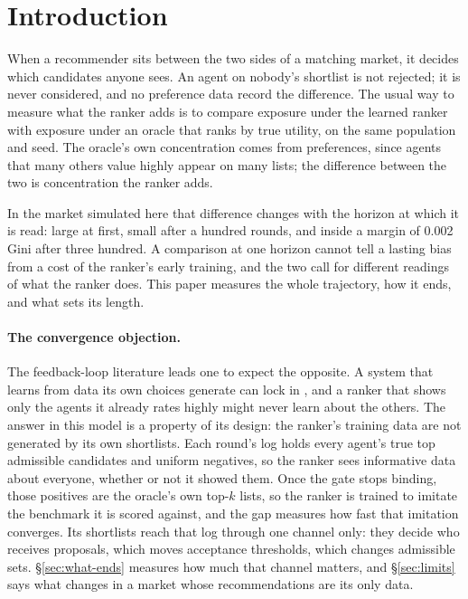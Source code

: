 
\section{Introduction}
\label{sec:intro}

When a recommender sits between the two sides of a matching market, it decides
which candidates anyone sees. An agent on nobody's shortlist is not rejected; it
is never considered, and no preference data record the difference. The usual way
to measure what the ranker adds is to compare exposure under the learned ranker
with exposure under an oracle that ranks by true utility, on the same population
and seed. The oracle's own concentration comes from preferences, since agents
that many others value highly appear on many lists; the difference between the
two is concentration the ranker adds.

In the market simulated here that difference changes with the horizon at which it
is read: large at first, small after a hundred rounds, and inside a margin of 0.002 Gini after three
hundred. A comparison at one horizon cannot tell a lasting bias
from a cost of the ranker's early training, and the two call for different
readings of what the ranker does. This paper measures the whole trajectory, how
it ends, and what sets its length.

\paragraph{The convergence objection.} The feedback-loop literature leads one to
expect the opposite. A system that learns from data its own choices generate can
lock in \citep{ensign2018,chaney2018,mansoury2020}, and a ranker that shows only
the agents it already rates highly might never learn about the others. The answer
in this model is a property of its design: the ranker's training data are not generated by its own shortlists. Each
round's log holds every agent's true top admissible candidates and uniform
negatives, so the ranker sees informative data about everyone, whether or not it showed them.
Once the gate stops binding, those positives are the oracle's own top-$k$ lists, so
the ranker is trained to imitate the benchmark it is scored against, and the gap
measures how fast that imitation converges. Its shortlists reach that log through one channel only: they decide who receives
proposals, which moves acceptance thresholds, which changes admissible sets.
\S\ref{sec:what-ends} measures how much that channel matters, and
\S\ref{sec:limits} says what changes in a market whose recommendations are its
only data.

